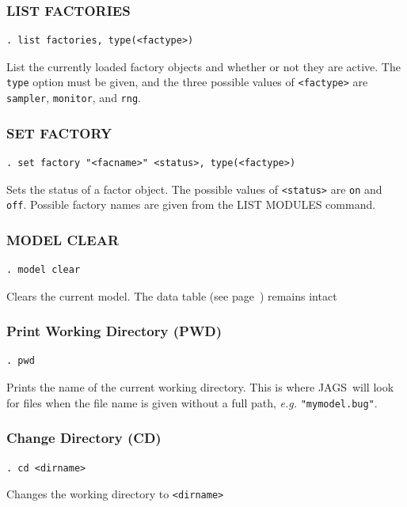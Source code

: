 \documentclass[11pt, a4paper, titlepage]{report}
\newcommand{\JAGS}{\textsf{JAGS}}
\begin{document}
\subsubsection{LIST FACTORIES}
\label{list:factories}
\begin{verbatim}
. list factories, type(<factype>)
\end{verbatim}
List the currently loaded factory objects and whether or not they are
active.  The \verb+type+ option must be given, and the three possible values
of \verb+<factype>+ are \verb+sampler+, \verb+monitor+, and \verb+rng+.

\subsubsection{SET FACTORY}
\label{set:factory}
\begin{verbatim}
. set factory "<facname>" <status>, type(<factype>)
\end{verbatim}
Sets the status of a factor object. The possible values of \verb+<status>+
are \verb+on+ and \verb+off+. Possible factory names are given from the
LIST MODULES command.

\subsubsection{MODEL CLEAR}
\label{model:clear}
\begin{verbatim}
. model clear
\end{verbatim}
Clears the current model.  The data table (see page~\pageref{data:in})
remains intact

\subsubsection{Print Working Directory (PWD)}
\begin{verbatim}
. pwd
\end{verbatim}
Prints the name of the current working directory. This is where \JAGS\
will look for files when the file name is given without a full path, 
{\em e.g.} \verb+"mymodel.bug"+.

\subsubsection{Change Directory (CD)}
\begin{verbatim}
. cd <dirname>
\end{verbatim}
Changes the working directory to \texttt{<dirname>}
\end{document}
